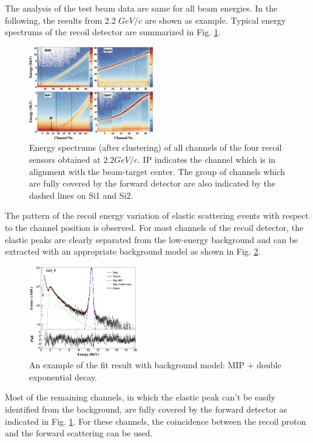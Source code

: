 \documentclass[number,5p]{elsarticle}
\begin{document}
The analysis of the test beam data are same for all beam energies.
In the following, the results from 2.2 $GeV/c$ are shown as example.
Typical energy spectrums of the recoil detector are summarized in Fig.
\ref{fig:e_map}.
\begin{figure}[htb!]
  \centering
  \includegraphics[width=0.48\textwidth]{./e_map.png}
  \caption{Energy spectrums (after clustering) of all channels of the four recoil
    sensors obtained at $2.2 GeV/c$.
    IP indicates the channel which is in alignment with
    the beam-target center.
    The group of channels which are fully covered by the forward detector are
    also indicated by the dashed lines on Si1 and Si2.
  }
  \label{fig:e_map}
\end{figure}
The pattern of the recoil energy variation of elastic scattering events with respect to the channel position is observed.
For most channels of the recoil detector, the elastic peaks are clearly
separated from the low-energy background
and can be extracted with an appropriate background model as shown in Fig. \ref{fig:e_fit}.
\begin{figure}[h!]
  \centering
  \includegraphics[width=0.42\textwidth]{./e_fit.png}
  \caption{An example of the fit result with background model: MIP + double
    exponential decay.}
  \label{fig:e_fit}
\end{figure}
Most of the remaining channels, in which the elastic peak can't be easily identified from the
background, are fully covered by the forward detector as indicated in Fig. \ref{fig:e_map}.
For these channels, the coincidence between the recoil proton and the forward
scattering can be used.
\end{document}

